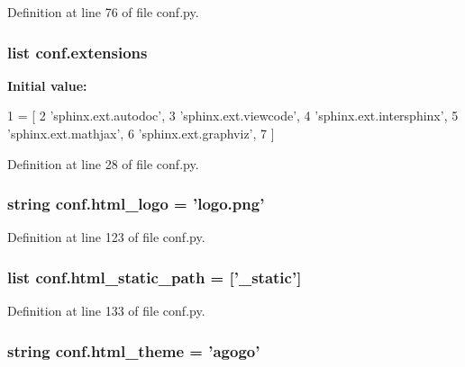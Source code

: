 Definition at line 76 of file conf.\-py.

\hypertarget{a00101_ae475e080536acb271a0a0efe56c3ba42}{
\subsubsection[{extensions}]{\setlength{\rightskip}{0pt plus 5cm}list conf.\-extensions}}\label{a00101_ae475e080536acb271a0a0efe56c3ba42}
{\bfseries Initial value\-:}
\begin{DoxyCode}
1 = [
2     \textcolor{stringliteral}{'sphinx.ext.autodoc'},
3     \textcolor{stringliteral}{'sphinx.ext.viewcode'},
4     \textcolor{stringliteral}{'sphinx.ext.intersphinx'},
5     \textcolor{stringliteral}{'sphinx.ext.mathjax'},
6     \textcolor{stringliteral}{'sphinx.ext.graphviz'},
7 ]
\end{DoxyCode}


Definition at line 28 of file conf.\-py.

\hypertarget{a00101_a85ebd472b7d3a9e41a63030cdd5944e6}{
\subsubsection[{html\-\_\-logo}]{\setlength{\rightskip}{0pt plus 5cm}string conf.\-html\-\_\-logo = 'logo.\-png'}}\label{a00101_a85ebd472b7d3a9e41a63030cdd5944e6}


Definition at line 123 of file conf.\-py.

\hypertarget{a00101_af4fb5d8851ccaade135c2668dd3ced41}{
\subsubsection[{html\-\_\-static\-\_\-path}]{\setlength{\rightskip}{0pt plus 5cm}list conf.\-html\-\_\-static\-\_\-path = \mbox{[}'\-\_\-static'\mbox{]}}}\label{a00101_af4fb5d8851ccaade135c2668dd3ced41}


Definition at line 133 of file conf.\-py.

\hypertarget{a00101_a6c3bfcc1a44546c1c75ce20f55bd0fd6}{
\subsubsection[{html\-\_\-theme}]{\setlength{\rightskip}{0pt plus 5cm}string conf.\-html\-\_\-theme = 'agogo'}}\label{a00101_a6c3bfcc1a44546c1c75ce20f55bd0fd6}


